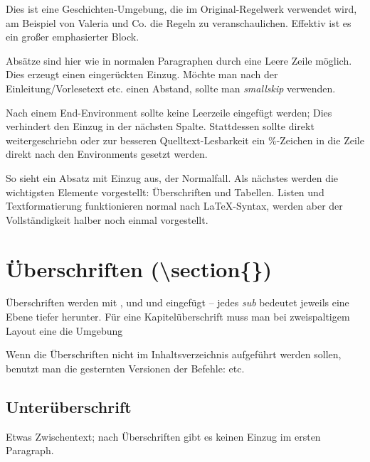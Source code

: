 \begin{multicols}{2}[        %
		]                    %

\begin{geschichte}
	Dies ist eine Geschichten-Umgebung, die im Original-Regelwerk verwendet wird, am Beispiel von Valeria und Co. die Regeln zu veranschaulichen. Effektiv ist es ein großer emphasierter Block.

	Absätze sind hier wie in normalen Paragraphen durch eine Leere Zeile möglich. Dies erzeugt einen eingerückten Einzug. Möchte man nach der Einleitung/Vorlesetext etc. einen Abstand, sollte man \emph{smallskip} verwenden.
\end{geschichte}
	Nach einem End-Environment sollte keine Leerzeile eingefügt werden; Dies verhindert den Einzug in der nächsten Spalte. Stattdessen sollte direkt weitergeschriebn oder zur besseren Quelltext-Lesbarkeit ein \%-Zeichen in die Zeile direkt nach den Environments gesetzt werden.

	So sieht ein Absatz mit Einzug aus, der Normalfall. Als nächstes werden die wichtigsten Elemente vorgestellt: Überschriften und Tabellen. Listen und Textformatierung funktionieren normal nach \LaTeX-Syntax, werden aber der Vollständigkeit halber noch einmal vorgestellt.


	\section[Überschriften]{Überschriften (\textbackslash{}section\{\})}
	Überschriften werden mit ,  und  und  eingefügt -- jedes \emph{sub} bedeutet jeweils eine Ebene tiefer herunter.
	Für eine Kapitelüberschrift muss man bei zweispaltigem Layout eine  die Umgebung  

	Wenn die Überschriften nicht im Inhaltsverzeichnis aufgeführt werden sollen, benutzt man die gesternten Versionen der Befehle:  etc.
	\subsection{Unterüberschrift}
	Etwas Zwischentext; nach Überschriften gibt es keinen Einzug im ersten Paragraph.

\end{multicols}
